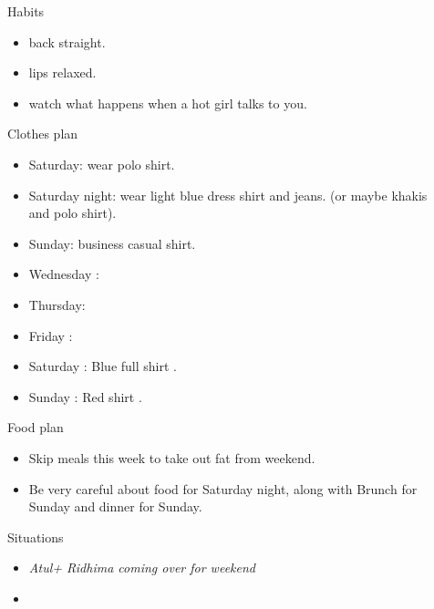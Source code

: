 \documentclass[serif, mathserif, final]{beamer}
\begin{document}
\begin{frame}{}
\begin{columns}
\begin{column}{0.25\linewidth}
  \begin{block}{ Habits } 
    \begin{itemize} 
      \tiny \item \tiny back straight. 
    \item \tiny lips relaxed. 
    \item \tiny watch what happens when a hot girl talks to you. 
    \end{itemize} 
  \end{block} 

  \begin{block}{ Clothes plan } 
    \begin{itemize} 
    \tiny \item \tiny Saturday: wear polo shirt. 
    \item \tiny Saturday night: wear light blue dress shirt and jeans. (or maybe khakis and polo shirt). 
    \item \tiny Sunday: business casual shirt. 
    \item \tiny Wednesday : 
    \item \tiny Thursday: 
    \item \tiny Friday : 
    \item \tiny Saturday : Blue full shirt . 
    \item \tiny Sunday : Red shirt .
    \end{itemize} 
  \end{block} 
  \begin{block}{ Food plan } 
    \begin{itemize} 
      \tiny \item \tiny Skip meals this week to take out fat from weekend. 
    \item \tiny Be very careful about food for Saturday night, along with Brunch for Sunday and dinner for Sunday. 
    \end{itemize} 
  \end{block} 

  \begin{block}{ Situations} 
    \begin{itemize} 
      \tiny \item \tiny \textit{Atul+ Ridhima coming over for weekend} 
    \item \tiny 
    \end{itemize}
  \end{block} 
\end{column} %
\begin{column}{0.50\linewidth}


\end{column}
\end{columns}
\end{frame}
\end{document}

